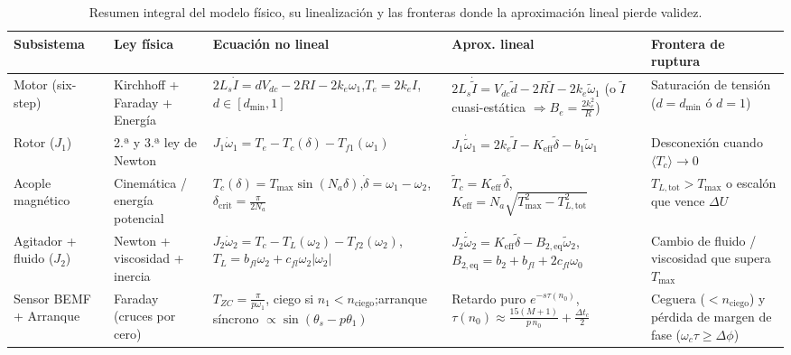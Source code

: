 \documentclass[11pt,a4paper,oneside]{book}
\begin{document}
\begin{table}[htbp]
\centering
\scriptsize
\setlength{\tabcolsep}{4pt}
\renewcommand{\arraystretch}{1.35}
\begin{tabular}{@{}
  >{\raggedright\arraybackslash}p{2.0cm}
  >{\raggedright\arraybackslash}p{2.1cm}
  >{\raggedright\arraybackslash}p{4.3cm}
  >{\raggedright\arraybackslash}p{3.4cm}
  >{\raggedright\arraybackslash}p{2.6cm}@{}}
\toprule
\textbf{Subsistema} & \textbf{Ley física} & \textbf{Ecuación no lineal} & \textbf{Aprox. lineal} & \textbf{Frontera de ruptura} \\
\midrule
Motor (six-step) & Kirchhoff + Faraday + Energía &
$2L_s\dot I = d V_{dc} - 2R I - 2k_e\omega_1$,\newline $T_e = 2k_e I$,\; $d\in[d_{\min},1]$ &
$2L_s\dot{\tilde I} = V_{dc}\tilde d - 2R\tilde I - 2k_e\tilde\omega_1$ (o $\tilde I$ cuasi-estática $\Rightarrow B_e=\frac{2k_e^2}{R}$) &
Saturación de tensión ($d=d_{\min}$ ó $d=1$) \\
\midrule
Rotor ($J_1$) & 2.ª y 3.ª ley de Newton &
$J_1\dot\omega_1 = T_e - T_c(\delta) - T_{f1}(\omega_1)$ &
$J_1\dot{\tilde\omega}_1 = 2k_e\tilde I - K_{\text{eff}}\tilde\delta - b_1\tilde\omega_1$ &
Desconexión cuando $\langle T_c\rangle \to 0$ \\
\midrule
Acople magnético & Cinemática / energía potencial &
$T_c(\delta) = T_{\max}\sin(N_a\delta)$,\newline $\dot\delta = \omega_1 - \omega_2$,\; $\delta_{\text{crit}}=\frac{\pi}{2N_a}$ &
$\tilde T_c = K_{\text{eff}}\,\tilde\delta$,\newline $K_{\text{eff}}=N_a\sqrt{T_{\max}^2-T_{L,\text{tot}}^2}$ &
$T_{L,\text{tot}} > T_{\max}$ o escalón que vence $\Delta U$ \\
\midrule
Agitador + fluido ($J_2$) & Newton + viscosidad + inercia &
$J_2\dot\omega_2 = T_c - T_L(\omega_2) - T_{f2}(\omega_2)$,\newline $T_L = b_{fl}\omega_2 + c_{fl}\omega_2|\omega_2|$ &
$J_2\dot{\tilde\omega}_2 = K_{\text{eff}}\tilde\delta - B_{2,\text{eq}}\tilde\omega_2$,\newline $B_{2,\text{eq}} = b_2 + b_{fl} + 2c_{fl}\omega_0$ &
Cambio de fluido / viscosidad que supera $T_{\max}$ \\
\midrule
Sensor BEMF + Arranque & Faraday (cruces por cero) &
$T_{ZC}=\frac{\pi}{p\omega_1}$, ciego si $n_1 < n_{\text{ciego}}$;\newline arranque síncrono $\propto\sin(\theta_s-p\theta_1)$ &
Retardo puro $e^{-s\tau(n_0)}$,\newline $\tau(n_0) \approx \frac{15(M+1)}{p\,n_0} + \frac{\Delta t_c}{2}$ &
Ceguera ($<n_{\text{ciego}}$) y pérdida de margen de fase ($\omega_c\tau\ge\Delta\phi$) \\
\bottomrule
\end{tabular}
\caption{Resumen integral del modelo físico, su linealización y las fronteras donde la aproximación lineal pierde validez.}
\label{tab:mapa_final}
\end{table}
\end{document}
